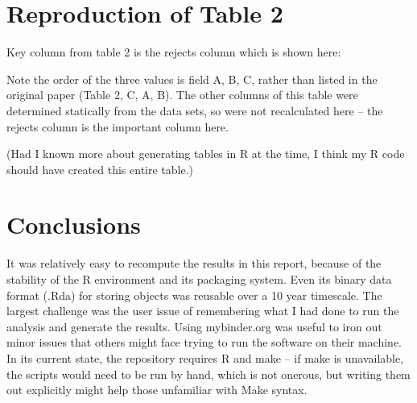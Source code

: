 \hypertarget{reproduction-of-table-2}{%
\section{Reproduction of Table 2}\label{reproduction-of-table-2}}

Key column from table 2 is the rejects column which is shown here:

\begin{Shaded}
\begin{Highlighting}[]
 \KeywordTok{\&}  \KeywordTok{\&} 
 \KeywordTok{\&}  \KeywordTok{\&} 
 \KeywordTok{\&}  \KeywordTok{\&} 
\end{Highlighting}
\end{Shaded}

Note the order of the three values is field A, B, C, rather than listed
in the original paper (Table 2, C, A, B). The other columns of this
table were determined statically from the data sets, so were not
recalculated here -- the rejects column is the important column here.

(Had I known more about generating tables in R at the time, I think my R
code should have created this entire table.)

\hypertarget{conclusions}{%
\section{Conclusions}\label{conclusions}}

It was relatively easy to recompute the results in this report, because
of the stability of the R environment and its packaging system. Even its
binary data format (.Rda) for storing objects was reusable over a 10
year timescale. The largest challenge was the user issue of remembering
what I had done to run the analysis and generate the results. Using
mybinder.org was useful to iron out minor issues that others might face
trying to run the software on their machine. In its current state, the
repository requires R and make -- if make is unavailable, the scripts
would need to be run by hand, which is not onerous, but writing them out
explicitly might help those unfamiliar with Make syntax.

